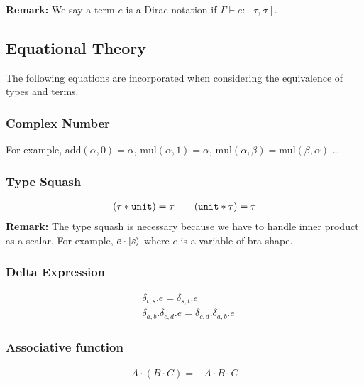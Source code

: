 \textbf{Remark:} We say a term $e$ is a Dirac notation if $\Gamma \vdash e : [\tau, \sigma]$.




\subsection{Equational Theory}
The following equations are incorporated when considering the equivalence of types and terms.

\subsubsection*{Complex Number}
For example, $\mathrm{add}(\alpha, 0) = \alpha$, $\mathrm{mul}(\alpha, 1) = \alpha$, $\mathrm{mul}(\alpha, \beta) = \mathrm{mul}(\beta, \alpha)$ \dots

\subsubsection*{Type Squash}
\begin{gather*}
  (\tau * \texttt{unit})  = \tau \qquad (\texttt{unit} * \tau) = \tau \\
\end{gather*}
\textbf{Remark:} The type squash is necessary because we have to handle inner product as a scalar. For example, $e \cdot |s\rangle$ where $e$ is a variable of bra shape.

\subsubsection*{Delta Expression}
\begin{align*}
    & \delta_{t, s}.e = \delta_{s, t}.e \\
    & \delta_{a, b}.\delta_{c, d}.e = \delta_{c, d}.\delta_{a, b}.e
\end{align*}

\subsubsection*{Associative function}
\begin{align*}
    A \cdot (B \cdot C) = & A \cdot B \cdot C
\end{align*}

